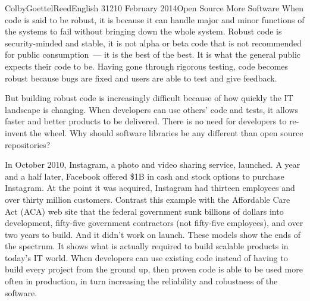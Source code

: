 \documentclass[12pt]{article}
\begin{document}
\begin{mla}{Colby}{Goettel}{Reed}{English 312}{10 February 2014}{Open Source More Software}
When code is said to be robust, it is because it can handle major and minor functions of the systems to fail without bringing down the whole system. Robust code is security-minded and stable, it is not alpha or beta code that is not recommended for public consumption~--- it is the best of the best. It is what the general public expects their code to be. Having gone through rigorous testing, code becomes robust because bugs are fixed and users are able to test and give feedback.

But building robust code is increasingly difficult because of how quickly the IT landscape is changing. When developers can use others' code and tests, it allows faster and better products to be delivered. There is no need for developers to re-invent the wheel. Why should software libraries be any different than open source repositories?

In October 2010, Instagram, a photo and video sharing service, launched. A year and a half later, Facebook offered \$1B in cash and stock options to purchase Instagram. At the point it was acquired, Instagram had thirteen employees and over thirty million customers. Contrast this example with the Affordable Care Act (ACA) web site that the federal government sunk billions of dollars into development, fifty-five government contractors (not fifty-five employees), and over two years to build. And it didn't work on launch. These models show the ends of the spectrum. It shows what is actually required to build scalable products in today's IT world. When developers can use existing code instead of having to build every project from the ground up, then proven code is able to be used more often in production, in turn increasing the reliability and robustness of the software.


\end{mla}
\end{document}
